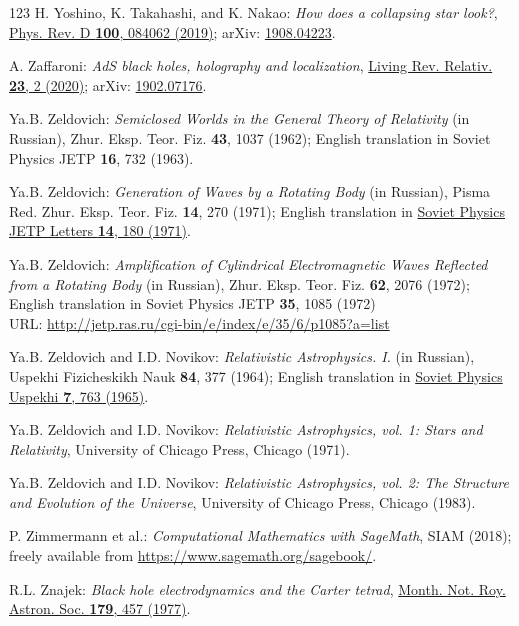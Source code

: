 \begin{thebibliography}{123}
H. Yoshino, K. Takahashi, and K. Nakao:
{\em How does a collapsing star look?},
\href{https://doi-org.ezproxy.obspm.fr/10.1103/PhysRevD.100.084062}{Phys. Rev. D {\bf 100}, 084062 (2019)};
arXiv: \href{https://arxiv.org/abs/1908.04223}{1908.04223}.

A. Zaffaroni:
{\em AdS black holes, holography and localization},
\href{https://doi.org/10.1007/s41114-020-00027-8}{Living Rev. Relativ. {\bf 23}, 2 (2020)};
arXiv: \href{https://arxiv.org/abs/1902.07176}{1902.07176}.


Ya.B. Zeldovich:
{\em Semiclosed Worlds in the General Theory of Relativity} (in Russian),
Zhur. Eksp. Teor. Fiz. {\bf 43}, 1037 (1962); English translation in
Soviet Physics JETP {\bf 16}, 732 (1963).

Ya.B. Zeldovich:
{\em Generation of Waves by a Rotating Body} (in Russian),
Pisma Red. Zhur. Eksp. Teor. Fiz. {\bf 14}, 270 (1971); English translation in
\href{http://jetpletters.ru/ps/0/article_24607.shtml}{Soviet Physics JETP Letters {\bf 14}, 180 (1971)}.

Ya.B. Zeldovich:
{\em Amplification of Cylindrical Electromagnetic Waves Reflected from a Rotating Body} (in Russian),
Zhur. Eksp. Teor. Fiz. {\bf 62}, 2076 (1972); English translation in
Soviet Physics JETP {\bf 35}, 1085 (1972)\\
URL: \url{http://jetp.ras.ru/cgi-bin/e/index/e/35/6/p1085?a=list}

Ya.B. Zeldovich and I.D. Novikov:
{\em Relativistic Astrophysics. I.} (in Russian),
Uspekhi Fizicheskikh Nauk {\bf 84}, 377 (1964);
English translation in \href{https://doi.org/10.1070/PU1965v007n06ABEH003683}{Soviet Physics Uspekhi {\bf 7}, 763 (1965)}.

Ya.B. Zeldovich and I.D. Novikov:
{\em Relativistic Astrophysics, vol. 1: Stars and Relativity},
University of Chicago Press, Chicago (1971).

Ya.B. Zeldovich and I.D. Novikov:
{\em Relativistic Astrophysics, vol. 2: The Structure and Evolution of the Universe},
University of Chicago Press, Chicago (1983).

P. Zimmermann et al.: {\em Computational Mathematics with SageMath}, SIAM (2018);
freely available from \url{https://www.sagemath.org/sagebook/}.

R.L. Znajek:
{\em Black hole electrodynamics and the Carter tetrad},
\href{https://doi.org/10.1093/mnras/179.3.457}{Month. Not. Roy. Astron. Soc. {\bf 179}, 457 (1977)}.

\end{thebibliography}
